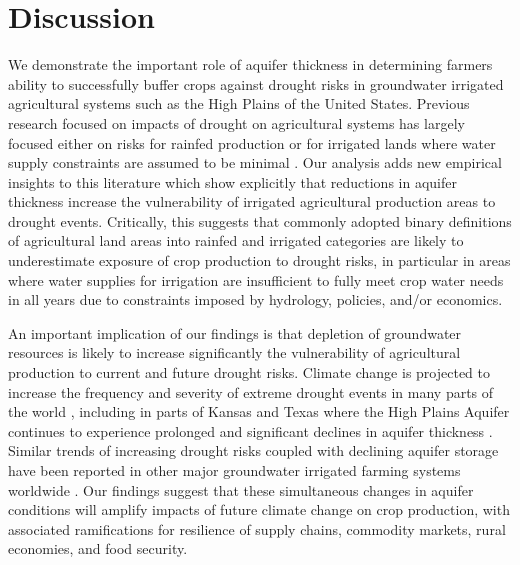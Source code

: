 \documentclass[
]{article}
\begin{document}
\hypertarget{discussion}{%
\section{Discussion}\label{discussion}}

We demonstrate the important role of aquifer thickness in determining farmers ability to successfully buffer crops against drought risks in groundwater irrigated agricultural systems such as the High Plains of the United States. Previous research focused on impacts of drought on agricultural systems has largely focused either on risks for rainfed production \citep{schlenker2009nonlinear,lobell2014greater,schlenker2010robust,zhou2020connections,borgomeo2020impact} or for irrigated lands where water supply constraints are assumed to be minimal \citep{kuwayama2019estimating,zipper2016drought,zhu2022untangling,zhu2022warming,lu2020mapping,davis2019sensitivity,li2018changes,luan2021combined}. Our analysis adds new empirical insights to this literature which show explicitly that reductions in aquifer thickness increase the vulnerability of irrigated agricultural production areas to drought events. Critically, this suggests that commonly adopted binary definitions of agricultural land areas into rainfed and irrigated categories are likely to underestimate exposure of crop production to drought risks, in particular in areas where water supplies for irrigation are insufficient to fully meet crop water needs in all years due to constraints imposed by hydrology, policies, and/or economics. 

An important implication of our findings is that depletion of groundwater resources is likely to increase significantly the vulnerability of agricultural production to current and future drought risks. Climate change is projected to increase the frequency and severity of extreme drought events in many parts of the world \citep{ukkola2020robust,chiang2021evidence,cook2020twenty}, including in parts of Kansas and Texas \citep{bradford2020robust,cook2022projected,mullens2019quantitative} where the High Plains Aquifer continues to experience prolonged and significant declines in aquifer thickness \citep{scanlon2012groundwater, haacker2016water, cotterman2018groundwater}. Similar trends of increasing drought risks coupled with declining aquifer storage have been reported in other major groundwater irrigated farming systems worldwide \citep{wada2010global, doll2014global, famiglietti2014global, feng2018groundwater, bierkens2019non}. Our findings suggest that these simultaneous changes in aquifer conditions will amplify impacts of future climate change on crop production, with associated ramifications for resilience of supply chains, commodity markets, rural economies, and food security.
\end{document}
